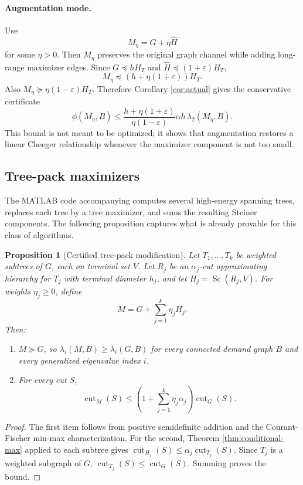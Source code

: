\documentclass[11pt]{article}
\newtheorem{proposition}[theorem]{Proposition}
\newcommand{\cut}{\operatorname{cut}}
\newcommand{\Sc}{\operatorname{Sc}}
\begin{document}
\paragraph{Augmentation mode.}
Use
\[
  M_\eta=G+\eta\widehat H
\]
for some $\eta>0$.  Then $M_\eta$ preserves the original graph channel while
adding long-range maximizer edges.  Since $G\preceq hH_T$ and
$\widehat H\preceq(1+\varepsilon)H_T$,
\[
  M_\eta\preceq (h+\eta(1+\varepsilon))H_T.
\]
Also $M_\eta\succeq \eta(1-\varepsilon)H_T$.  Therefore Corollary
\ref{cor:actual} gives the conservative certificate
\[
  \phi(M_\eta,B)
  \le
  \frac{h+\eta(1+\varepsilon)}{\eta(1-\varepsilon)}
  \alpha h\,\lambda_2(M_\eta,B).
\]
This bound is not meant to be optimized; it shows that augmentation restores a
linear Cheeger relationship whenever the maximizer component is not too small.

\subsection{Tree-pack maximizers}

The MATLAB code accompanying \cite{koutis2019spectral} computes several
high-energy spanning trees, replaces each tree by a tree maximizer, and sums
the resulting Steiner components.  The following proposition captures what is
already provable for this class of algorithms.

\begin{proposition}[Certified tree-pack modification]
\label{prop:tree-pack}
Let $T_1,\ldots,T_k$ be weighted subtrees of $G$, each on terminal set $V$.
Let $R_j$ be an $\alpha_j$-cut approximating hierarchy for $T_j$ with
terminal diameter $h_j$, and let $H_j=\Sc(R_j,V)$.  For weights
$\eta_j\ge0$, define
\[
  M=G+\sum_{j=1}^k \eta_j H_j .
\]
Then:
\begin{enumerate}
\item $M\succeq G$, so $\lambda_i(M,B)\ge \lambda_i(G,B)$ for every connected
demand graph $B$ and every generalized eigenvalue index $i$.
\item For every cut $S$,
\[
  \cut_M(S)
  \le
  \left(1+\sum_{j=1}^k\eta_j\alpha_j\right)\cut_G(S).
\]
\end{enumerate}
\end{proposition}

\begin{proof}
The first item follows from positive semidefinite addition and the
Courant-Fischer min-max characterization.  For the second, Theorem
\ref{thm:conditional-max} applied to each subtree gives
$\cut_{H_j}(S)\le \alpha_j\cut_{T_j}(S)$.  Since $T_j$ is a weighted subgraph
of $G$, $\cut_{T_j}(S)\le\cut_G(S)$.  Summing proves the bound.
\end{proof}
\end{document}

